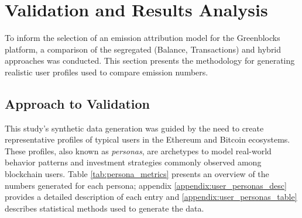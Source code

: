 \documentclass[11pt]{report}
\begin{document}
\section{Validation and Results Analysis}

To inform the selection of an emission attribution model for the Greenblocks platform, a comparison of the segregated (Balance, Transactions) and hybrid approaches was conducted. This section presents the methodology for generating realistic user profiles used to compare emission numbers.

\subsection{Approach to Validation \label{sec:approach_validation}}

This study's synthetic data generation was guided by the need to create representative profiles of typical users in the Ethereum and Bitcoin ecosystems. These profiles, also known as \textit{personas}, are archetypes to model real-world behavior patterns and investment strategies commonly observed among blockchain users. Table \ref{tab:persona_metrics} presents an overview of the numbers generated for each persona; appendix \ref{appendix:user_personas_desc} provides a detailed description of each entry and \ref{appendix:user_personas_table} describes statistical methods used to generate the data.
\end{document}
